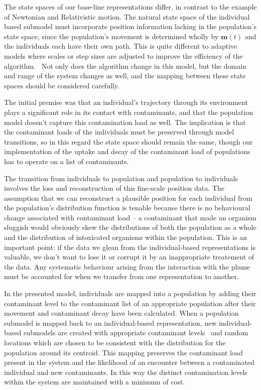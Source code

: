 \documentclass[preprint,authoryear,5p,twocolumn]{elsarticle}
\begin{document}
The state spaces of our base-line representations differ, in contrast to the example of Newtonian and Relativistic
motion. The natural state space of the individual based submodel must incorporate position information lacking in the
population's state space, since the population's movement is determined wholly by $\mathbf{m}(t)$ and the individuals
each have their own path. This is quite different to adaptive models where scales or step sizes are adjusted to improve
the efficiency of the algorithm. \ Not only does the algorithm change in this model, but the domain and range of the
system changes as well, and the mapping between these state spaces should be considered carefully.

The initial premise was that an individual's trajectory through its environment plays a significant role in its contact
with contaminants, and that the population model doesn't capture this contamination load as well. The implication is
that the contaminant loads of the individuals must be preserved through model transitions, so in this regard the state
space should remain the same, though our implementation of the uptake and decay of the contaminant load of populations
has to operate on a list of contaminants.

The transition from individuals to population and population to individuals involves the loss and reconstruction of
this fine-scale position data. The assumption that we can reconstruct a plausible position for each individual from the
population's distribution function is tenable because there is no behavioural change associated with contaminant load
-- a contaminant that made an organism sluggish would obviously skew the distributions of both the population as a
whole and the distribution of intoxicated organisms within the population. This is an important point: if the data we
glean from the individual-based representations is valuable, we don't want to lose it or corrupt it by an inappropriate
treatement of the data. Any systematic behaviour arising from the interaction with the plume must be accounted for when
we transfer from one representation to another.

In the presented model, individuals are mapped into a population by adding their contaminant level to the contaminant
list of an appropriate population after their movement and contaminant decay have been calculated. When a population
submodel is mapped back to an individual-based representation, new individual-based submodels are created with
appropriate contaminant levels \ and random locations which are chosen to be consistent with the distribution for the
population around its centroid. This mapping preserves the contaminant load present in the system and the likelihood of
an encounter between a contaminated individual and new contaminants. In this way the distinct contamination levels
within the system are maintained with a minimum of cost.
\end{document}
